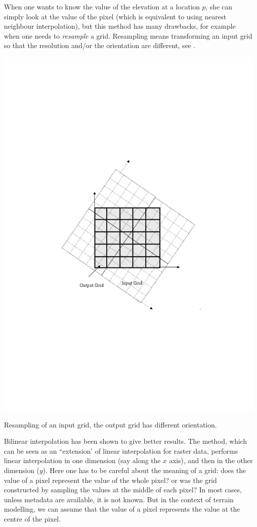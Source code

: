 When one wants to know the value of the elevation at a location $p$, she can simply look at the value of the pixel (which is equivalent to using nearest neighbour interpolation), but this method has many drawbacks, for example when one needs to \emph{resample} a grid. 
Resampling means transforming an input grid so that the resolution and/or the orientation are different, see .
\begin{marginfigure}
  \centering
  \includegraphics[width=\textwidth]{figs/resampling}
  \caption{Resampling of an input grid, the output grid has different orientation.} %
\end{marginfigure}

Bilinear interpolation has been shown to give better results. 
The method, which can be seen as an ``extension' of linear interpolation for raster data, performs linear interpolation in one dimension (say along the $x$ axis), and then in the other dimension ($y$). 
Here one has to be careful about the meaning of a grid: does the value of a pixel represent the value of the whole pixel? or was the grid constructed by sampling the values at the middle of each pixel? 
In most cases, unless metadata are available, it is not known. 
But in the context of terrain modelling, we can assume that the value of a pixel represents the value at the centre of the pixel.

